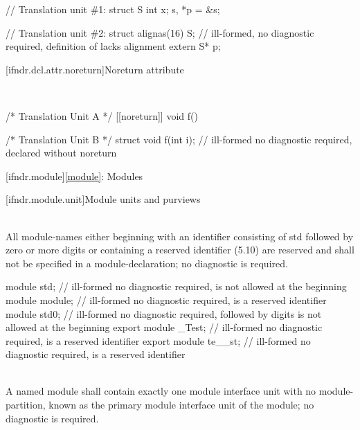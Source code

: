 \pnum
\begin{example}
\begin{codeblock}
// Translation unit \#1:
struct S { int x; } s, *p = &s;

// Translation unit \#2:
struct alignas(16) S;   // ill-formed, no diagnostic required, definition of  lacks alignment
extern S* p;
\end{codeblock}
\end{example}

[ifndr.dcl.attr.noreturn]{Noreturn attribute}

\pnum
{} \\

\pnum
\begin{example}
\begin{codeblock}
/* Translation Unit A */
[[noreturn]] void f() {
}

/* Translation Unit B */
struct void f(int i);   // ill-formed no diagnostic required, declared without noreturn
\end{codeblock}
\end{example}

[ifndr.module]{\ref{module}: Modules}

[ifndr.module.unit]{Module units and purviews}

\pnum
{} \\
All module-names either beginning with an identifier consisting of
std followed by zero or more digits or containing a reserved identifier (5.10) are reserved and shall not be
specified in a module-declaration; no diagnostic is required.

\pnum
\begin{example}
\begin{codeblock}
module std;             // ill-formed no diagnostic required,  is not allowed at the beginning
module module;          // ill-formed no diagnostic required,  is a reserved identifier
module std0;            // ill-formed no diagnostic required,  followed by digits is not allowed at the beginning
export module _Test;    // ill-formed no diagnostic required,  is a reserved identifier
export module te__st;   // ill-formed no diagnostic required,  is a reserved identifier
\end{codeblock}
\end{example}


\pnum
{} \\
A named module shall contain exactly one module interface
unit with no module-partition, known as the primary module interface unit of the module; no diagnostic is
required.

